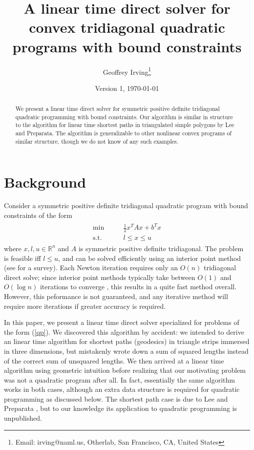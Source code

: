 \documentclass[11pt]{article}
\title{A linear time direct solver for convex tridiagonal quadratic programs with bound constraints}
\author{Geoffrey Irving\thanks{Email: irving@naml.us, Otherlab, San Francisco, CA, United States}}
\date{Version 1, \today}
\newcommand{\R}{\mathbb{R}}
\begin{document}
\maketitle

\begin{abstract}
We present a linear time direct solver for symmetric positive definite tridiagonal quadratic programming with bound constraints.  Our algorithm is similar in structure to the
algorithm for linear time shortest paths in triangulated simple polygons by Lee and Preparata.  The algorithm is generalizable to other nonlinear convex programs of similar
structure, though we do not know of any such examples.
\end{abstract}

\section{Background}

Consider a symmetric positive definite tridiagonal quadratic program with bound constraints of the form
\begin{align} \label{qp}
\begin{array}{cc}
\min          \qquad& \frac{1}{2} x^T A x + b^T x \\
\textrm{s.t.} & l \le x \le u
\end{array}
\end{align}
where $x,l,u \in \R^n$ and $A$ is symmetric positive definite tridiagonal.  The problem is feasible iff $l \le u$, and can be solved efficiently using an interior point method (see \cite{gondzio2012interior}
for a survey).  Each Newton iteration requires only an $O(n)$ tridiagonal direct solve; since interior point methods typically take between $O(1)$ and $O(\log n)$ iterations to converge \cite{colombo2008further},
this results in a quite fast method overall.  However, this peformance is not guaranteed, and any iterative method will require more iterations if greater accuracy is required.

In this paper, we present a linear time direct solver specialized for problems of the form (\autoref{qp}).  We discovered this algorithm by accident: we intended to derive an linear time algorithm
for shortest paths (geodesics) in triangle strips immersed in three dimensions, but mistakenly wrote down a sum of squared lengths instead of the correct sum of unsquared lengths.  We then arrived at a linear time algorithm
using geometric intuition before realizing that our motivating problem was not a quadratic program after all.  In fact, essentially the same algorithm works in both cases, although an extra data structure is required
for quadratic programming as discussed below.  The shortest path case is due to Lee and Preparata \cite{lee1984euclidean}, but to our knowledge its application to quadratic programming is unpublished.
\end{document}
